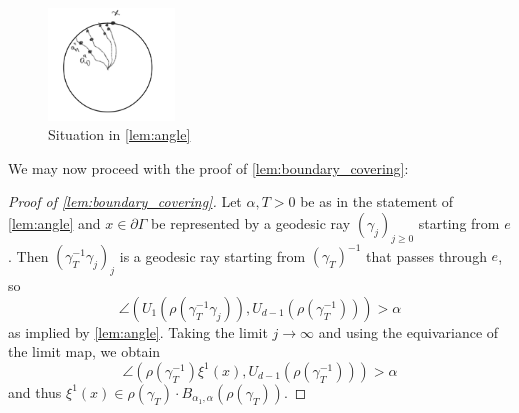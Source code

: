 \documentclass{report}
\begin{document}
\begin{figure}[h]
    \centering
    \includegraphics[width=0.3\textwidth]{angle.jpg}
    \caption{Situation in \cref{lem:angle}}
    \label{fig:angle}
\end{figure}    
We may now proceed with the proof of \cref{lem:boundary_covering}:
\begin{proof}[Proof of \cref{lem:boundary_covering}]
    Let $\alpha, T > 0$ be as in the statement of \cref{lem:angle} and $x \in \partial \Gamma$ be represented by a geodesic ray $(\gamma_j)_{j\geq 0}$ starting from $e$.
    Then $(\gamma_T^{-1} \gamma_j)_j$ is a geodesic ray starting from $(\gamma_T)^{-1}$ that passes through $e$, so
    \[
        \angle (U_1(\rho(\gamma_T^{-1}\gamma_j)), U_{d-1}(\rho(\gamma_T^{-1}))) > \alpha
    \]
    as implied by \cref{lem:angle}.
    Taking the limit $j \to \infty$ and using the equivariance of the limit map, we obtain
    \[
        \angle (\rho(\gamma_T^{-1})\xi^1(x), U_{d-1}(\rho(\gamma_T^{-1}))) > \alpha
    \]
    and thus $\xi^1(x) \in \rho(\gamma_T) \cdot B_{\alpha_1, \alpha}(\rho(\gamma_T))$.
\end{proof}
\end{document}
